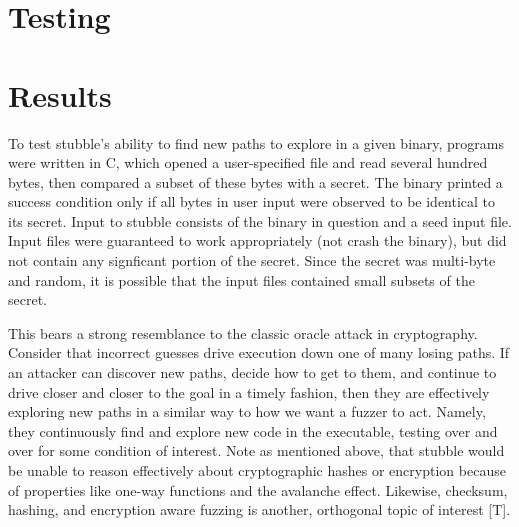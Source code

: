 \documentclass[11pt,expanded,copyright]{fsuthesis}
\begin{document}




\section{Testing}

\section{Results}

To test stubble's ability to find new paths to explore in a given binary, programs were written in C, which opened a user-specified file and read several hundred bytes, then compared a subset of these bytes with a secret. The binary printed a success condition only if all bytes in user input were observed to be identical to its secret. Input to stubble consists of the binary in question and a seed input file. Input files were guaranteed to work appropriately (not crash the binary), but did not contain any signficant portion of the secret. Since the secret was multi-byte and random, it is possible that the input files contained small subsets of the secret.

This bears a strong resemblance to the classic oracle attack in cryptography. Consider that incorrect guesses drive execution down one of many losing paths. If an attacker can discover new paths, decide how to get to them, and continue to drive closer and closer to the goal in a timely fashion, then they are effectively exploring new paths in a similar way to how we want a fuzzer to act. Namely, they continuously find and explore new code in the executable, testing over and over for some condition of interest. Note as mentioned above, that stubble would be unable to reason effectively about cryptographic hashes or encryption because of properties like one-way functions and the avalanche effect. Likewise, checksum, hashing, and encryption aware fuzzing is another, orthogonal topic of interest [T].
\end{document}
